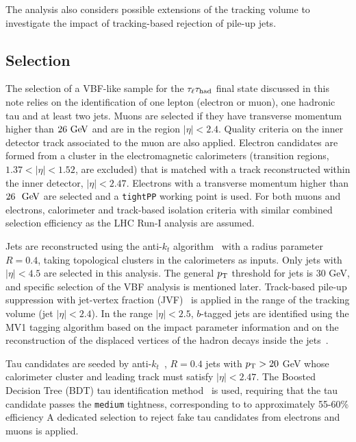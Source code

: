 The analysis also considers possible extensions of the tracking volume to investigate the impact of tracking-based rejection of pile-up jets. 

\subsection{Selection}

The selection of a VBF-like sample for the $\tau_\ell\tau_\text{had}$ final state discussed in this note relies on the identification of one lepton (electron or muon), one hadronic tau and at least two jets. Muons are selected if they have transverse momentum higher than $26 \GeV$ and are in the region $|\eta|<2.4$. Quality criteria on the inner detector track associated to the muon are also applied. Electron candidates are formed from a cluster in the electromagnetic calorimeters (transition regions, $1.37<|\eta|<1.52$, are excluded) that is matched with a track reconstructed within the inner detector, $|\eta|<2.47$. Electrons with a transverse momentum higher than $26~\GeV$ are selected and a \texttt{tightPP} working point is used. For both muons and electrons, calorimeter and track-based isolation criteria with similar combined selection efficiency as the LHC Run-I analysis are assumed.

Jets are reconstructed using the anti-$k_t$ algorithm~\cite{Antikt1} with a radius parameter $R=0.4$, taking topological clusters in the calorimeters as inputs. Only jets with $|\eta|<4.5$ are selected in this analysis. The general $p_{\mathrm{T}}$ threshold for jets is 30 GeV, and specific selection of the VBF analysis is mentioned later. Track-based pile-up suppression with jet-vertex fraction (JVF)~\cite{ATLAS-CONF-2014-018} is applied in the range of the tracking volume (jet $|\eta| < 2.4$). In the range $\left|\eta\right|<2.5$, $b$-tagged jets are identified using the MV1 tagging algorithm based on the impact parameter information and on the reconstruction of the displaced vertices of the hadron decays inside the jets~\cite{ATLAS-CONF-2014-046}. 

Tau candidates are seeded by anti-$k_t$~\cite{Antikt1}, $R=0.4$ jets with $p_{\mathrm{T}} > 20$ GeV whose calorimeter cluster and leading track must satisfy $|\eta| < 2.47$. The Boosted Decision Tree (BDT) tau identification method~\cite{PERF-2013-06} is used, requiring that the tau candidate passes the \texttt{medium} tightness, corresponding to to approximately 55-60\% efficiency A dedicated selection to reject fake tau candidates from electrons and muons is applied.

